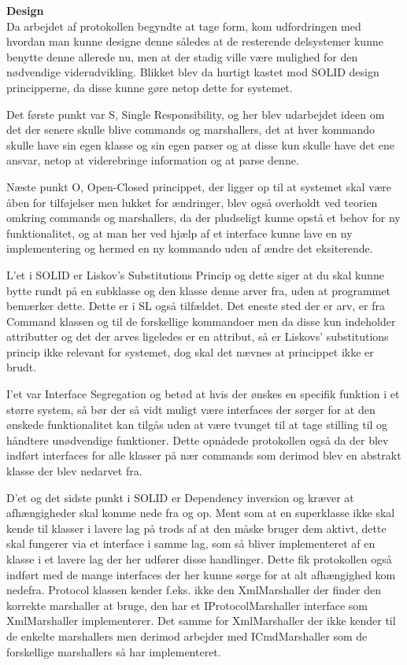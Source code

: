 \textbf{Design}\\

Da arbejdet af protokollen begyndte at tage form, kom udfordringen med hvordan man kunne designe denne således at de resterende delsystemer kunne benytte denne allerede nu, men at der stadig ville være mulighed for den nødvendige viderudvikling. Blikket blev da hurtigt kastet mod SOLID design principperne, da disse kunne gøre netop dette for systemet.

Det første punkt var S, Single Responsibility, og her blev udarbejdet ideen om det der senere skulle blive commands og marshallers, det at hver kommando skulle have sin egen klasse og sin egen parser og at disse kun skulle have det ene ansvar, netop at viderebringe information og at parse denne.

Næste punkt O, Open-Closed princippet, der ligger op til at systemet skal være åben for tilføjelser men lukket for ændringer, blev også overholdt ved teorien omkring commands og marshallers, da der pludseligt kunne opstå et behov for ny funktionalitet, og at man her ved hjælp af et interface kunne lave en ny implementering og hermed en ny kommando uden af ændre det eksiterende.

L'et i SOLID er Liskov's Substitutions Princip og dette siger at du skal kunne bytte rundt på en subklasse og den klasse denne arver fra, uden at programmet bemærker dette. Dette er i \gls{SL} også tilfældet. Det eneste sted der er arv, er fra Command klassen og til de forskellige kommandoer men da disse kun indeholder attributter og det der arves ligeledes er en attribut, så er Liskovs' substitutions princip ikke relevant for systemet, dog skal det nævnes at princippet ikke er brudt.

I'et var Interface Segregation og betød at hvis der ønskes en specifik funktion i et større system, så bør der så vidt muligt være interfaces der sørger for at den ønskede funktionalitet kan tilgås uden at være tvunget til at tage stilling til og håndtere unødvendige funktioner. Dette opnådede protokollen også da der blev indført interfaces for alle klasser på nær commands som derimod blev en abstrakt klasse der blev nedarvet fra.

D'et og det sidste punkt i SOLID er Dependency inversion og kræver at afhængigheder skal komme nede fra og op. Ment som at en superklasse ikke skal kende til klasser i lavere lag på trods af at den måske bruger dem aktivt, dette skal fungerer via et interface i samme lag, som så bliver implementeret af en klasse i et lavere lag der her udfører disse handlinger. Dette fik protokollen også indført med de mange interfaces der her kunne sørge for at alt afhængighed kom nedefra. Protocol klassen kender f.eks. ikke den XmlMarshaller der finder den korrekte marshaller at bruge, den har et IProtocolMarshaller interface som XmlMarshaller implementerer. Det samme for XmlMarshaller der ikke kender til de enkelte marshallers men derimod arbejder med ICmdMarshaller som de forskellige marshallers så har implementeret.\\

